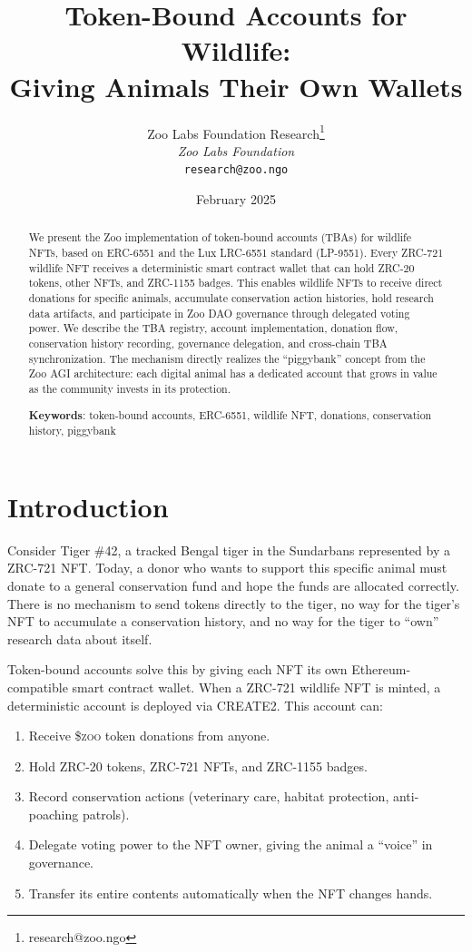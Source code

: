 \documentclass[11pt,letterpaper]{article}
\title{\textbf{Token-Bound Accounts for Wildlife:\\Giving Animals Their Own Wallets}}
\author{
Zoo Labs Foundation Research\thanks{research@zoo.ngo}\\
\textit{Zoo Labs Foundation}\\
\texttt{research@zoo.ngo}
}
\date{February 2025}
\newcommand{\ZOO}{\$\textsc{zoo}}
\begin{document}
\zoocoverpage

\begin{abstract}
We present the Zoo implementation of token-bound accounts (TBAs) for wildlife NFTs, based on ERC-6551 and the Lux LRC-6551 standard (LP-9551). Every ZRC-721 wildlife NFT receives a deterministic smart contract wallet that can hold ZRC-20 tokens, other NFTs, and ZRC-1155 badges. This enables wildlife NFTs to receive direct donations for specific animals, accumulate conservation action histories, hold research data artifacts, and participate in Zoo DAO governance through delegated voting power. We describe the TBA registry, account implementation, donation flow, conservation history recording, governance delegation, and cross-chain TBA synchronization. The mechanism directly realizes the ``piggybank'' concept from the Zoo AGI architecture: each digital animal has a dedicated account that grows in value as the community invests in its protection.

\textbf{Keywords}: token-bound accounts, ERC-6551, wildlife NFT, donations, conservation history, piggybank
\end{abstract}

\section{Introduction}

Consider Tiger \#42, a tracked Bengal tiger in the Sundarbans represented by a ZRC-721 NFT. Today, a donor who wants to support this specific animal must donate to a general conservation fund and hope the funds are allocated correctly. There is no mechanism to send tokens directly to the tiger, no way for the tiger's NFT to accumulate a conservation history, and no way for the tiger to ``own'' research data about itself.

Token-bound accounts solve this by giving each NFT its own Ethereum-compatible smart contract wallet. When a ZRC-721 wildlife NFT is minted, a deterministic account is deployed via CREATE2. This account can:

\begin{enumerate}
    \item Receive \ZOO{} token donations from anyone.
    \item Hold ZRC-20 tokens, ZRC-721 NFTs, and ZRC-1155 badges.
    \item Record conservation actions (veterinary care, habitat protection, anti-poaching patrols).
    \item Delegate voting power to the NFT owner, giving the animal a ``voice'' in governance.
    \item Transfer its entire contents automatically when the NFT changes hands.
\end{enumerate}
\end{document}
